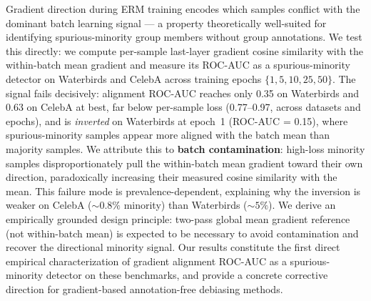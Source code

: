 Gradient direction during ERM training encodes which samples conflict with the dominant batch learning signal --- a property theoretically well-suited for identifying spurious-minority group members without group annotations.
We test this directly: we compute per-sample last-layer gradient cosine similarity with the within-batch mean gradient and measure its ROC-AUC as a spurious-minority detector on Waterbirds and CelebA across training epochs $\{1, 5, 10, 25, 50\}$.
The signal fails decisively: alignment ROC-AUC reaches only 0.35 on Waterbirds and 0.63 on CelebA at best, far below per-sample loss (0.77--0.97, across datasets and epochs), and is \emph{inverted} on Waterbirds at epoch~1 (ROC-AUC = 0.15), where spurious-minority samples appear more aligned with the batch mean than majority samples.
We attribute this to \textbf{batch contamination}: high-loss minority samples disproportionately pull the within-batch mean gradient toward their own direction, paradoxically increasing their measured cosine similarity with the mean.
This failure mode is prevalence-dependent, explaining why the inversion is weaker on CelebA (${\sim}0.8\%$ minority) than Waterbirds (${\sim}5\%$).
We derive an empirically grounded design principle: two-pass global mean gradient reference (not within-batch mean) is expected to be necessary to avoid contamination and recover the directional minority signal.
Our results constitute the first direct empirical characterization of gradient alignment ROC-AUC as a spurious-minority detector on these benchmarks, and provide a concrete corrective direction for gradient-based annotation-free debiasing methods.
